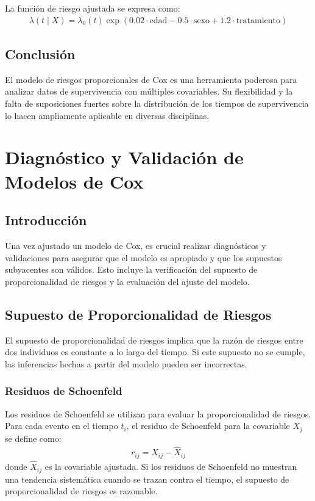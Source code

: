 \documentclass[a4paper]{report} %
\begin{document}
La funci\'on de riesgo ajustada se expresa como:
\begin{eqnarray*}
\lambda(t \mid X) = \lambda_0(t) \exp(0.02 \cdot \text{edad} - 0.5 \cdot \text{sexo} + 1.2 \cdot \text{tratamiento})
\end{eqnarray*}

\section{Conclusi\'on}
El modelo de riesgos proporcionales de Cox es una herramienta poderosa para analizar datos de supervivencia con m\'ultiples covariables. Su flexibilidad y la falta de suposiciones fuertes sobre la distribuci\'on de los tiempos de supervivencia lo hacen ampliamente aplicable en diversas disciplinas.



\chapter{Diagn\'ostico y Validaci\'on de Modelos de Cox}

\section{Introducci\'on}
Una vez ajustado un modelo de Cox, es crucial realizar diagn\'osticos y validaciones para asegurar que el modelo es apropiado y que los supuestos subyacentes son v\'alidos. Esto incluye la verificaci\'on del supuesto de proporcionalidad de riesgos y la evaluaci\'on del ajuste del modelo.

\section{Supuesto de Proporcionalidad de Riesgos}
El supuesto de proporcionalidad de riesgos implica que la raz\'on de riesgos entre dos individuos es constante a lo largo del tiempo. Si este supuesto no se cumple, las inferencias hechas a partir del modelo pueden ser incorrectas.

\subsection{Residuos de Schoenfeld}
Los residuos de Schoenfeld se utilizan para evaluar la proporcionalidad de riesgos. Para cada evento en el tiempo $t_i$, el residuo de Schoenfeld para la covariable $X_j$ se define como:
\begin{eqnarray*}
r_{ij} = X_{ij} - \hat{X}_{ij}
\end{eqnarray*}
donde $\hat{X}_{ij}$ es la covariable ajustada. Si los residuos de Schoenfeld no muestran una tendencia sistem\'atica cuando se trazan contra el tiempo, el supuesto de proporcionalidad de riesgos es razonable.
\end{document}
